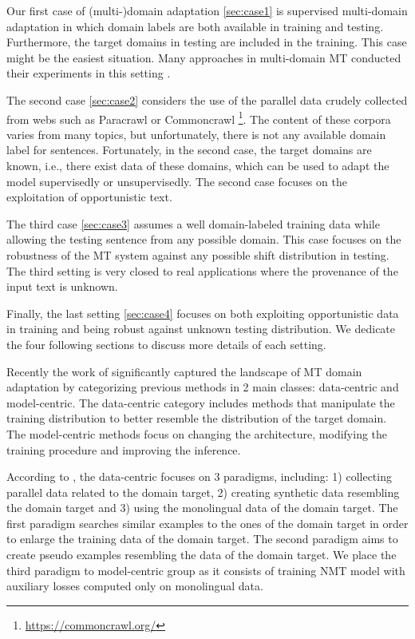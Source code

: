 Our first case of (multi-)domain adaptation \ref{sec:case1} is supervised multi-domain adaptation in which domain labels are both available in training and testing. Furthermore, the target domains in testing are included in the training. This case might be the easiest situation. Many approaches in multi-domain MT conducted their experiments in this setting \cite{Pham21revisiting}. 

The second case \ref{sec:case2} considers the use of the parallel data crudely collected from webs such as Paracrawl \citep{Banon20Paracrawl} or Commoncrawl \footnote{\url{https://commoncrawl.org/}}. The content of these corpora varies from many topics, but unfortunately, there is not any available domain label for sentences. Fortunately, in the second case, the target domains are known, i.e., there exist data of these domains, which can be used to adapt the model supervisedly or unsupervisedly. The second case focuses on the exploitation of opportunistic text. 

The third case \ref{sec:case3} assumes a well domain-labeled training data while allowing the testing sentence from any possible domain. This case focuses on the robustness of the MT system against any possible shift distribution in testing. The third setting is very closed to real applications where the provenance of the input text is unknown. 

Finally, the last setting \ref{sec:case4} focuses on both exploiting opportunistic data in training and being robust against unknown testing distribution. We dedicate the four following sections to discuss more details of each setting.

Recently the work of \citet{Chu18survey} significantly captured the landscape of MT domain adaptation by categorizing previous methods in 2 main classes: data-centric and model-centric. The data-centric category includes methods that manipulate the training distribution to better resemble the distribution of the target domain. The model-centric methods focus on changing the architecture, modifying the training procedure and improving the inference.

According to \citet{Chu18asurvey}, the data-centric focuses on 3 paradigms, including: 1) collecting parallel data related to the domain target, 2) creating synthetic data resembling the domain target and 3) using the monolingual data of the domain target. The first paradigm searches similar examples to the ones of the domain target in order to enlarge the training data of the domain target. The second paradigm aims to create pseudo examples resembling the data of the domain target. We place the third paradigm to model-centric group as it consists of training NMT model with auxiliary losses computed only on monolingual data. 

